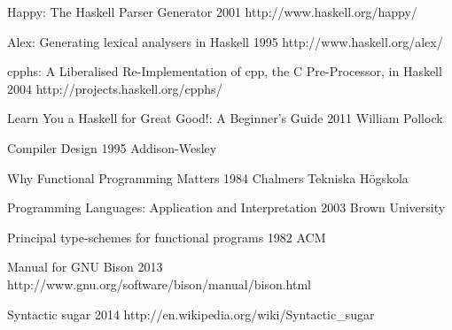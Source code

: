 
\begingroup
\renewcommand{\section}[2]{}%

\begin{thebibliography}{99}

  {Happy: The Haskell Parser Generator}
  {2001}
  {http://www.haskell.org/happy/}

  {Alex: Generating lexical analysers in Haskell}
  {1995}
  {http://www.haskell.org/alex/}

  {cpphs: A Liberalised Re-Implementation of cpp, the C Pre-Processor, in Haskell}
  {2004}
  {http://projects.haskell.org/cpphs/}

  {Learn You a Haskell for Great Good!: A Beginner's Guide}
  {2011}
  {William Pollock}

  {Compiler Design}
  {1995}
  {Addison-Wesley}

  {Why Functional Programming Matters}
  {1984}
  {Chalmers Tekniska Högskola}

  {Programming Languages: Application and Interpretation}
  {2003}
  {Brown University}

  {Principal type-schemes for functional programs}
  {1982}
  {ACM}

  {Manual for GNU Bison }
  {2013}
  {http://www.gnu.org/software/bison/manual/bison.html}

  {Syntactic sugar}
  {2014}
  {http://en.wikipedia.org/wiki/Syntactic_sugar}

\end{thebibliography}

\endgroup